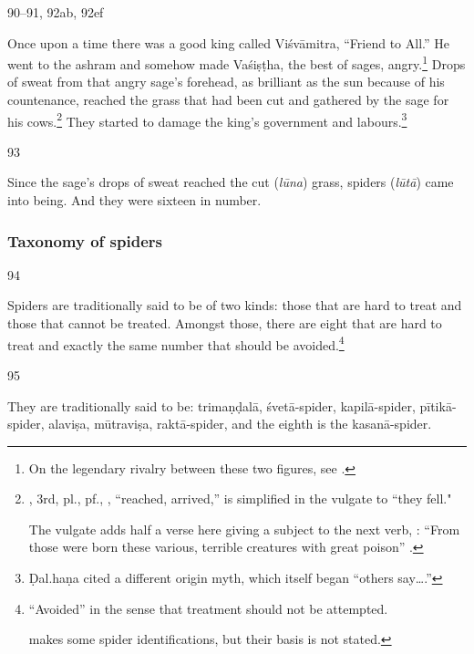 \begin{translation}
 \bigskip
    
\item[90--91, 92ab, 92ef]        

Once upon a time there was a good king called Viśvāmitra, “Friend to
All.”  He went to the ashram and somehow made Vaśiṣṭha, the best of
sages, angry.\footnote{On the legendary rivalry between these two
    figures, see \cite[Introduction, et passim]{sath-2015}.} Drops of
    sweat from that angry sage's forehead, as brilliant as the sun because
    of his countenance, reached the grass that had been cut
   and gathered by the sage for his
    cows.\footnote{, 3rd, pl., pf., \root {},
        “reached, arrived,” is simplified in the vulgate to  “they
        fell."
    
    The vulgate adds half a verse here giving a subject to the next
verb, : “From those were born these various,
terrible creatures with great poison” .} They
started to damage the king's government and labours.\footnote{Ḍal.haṇa 
    cited a different origin myth, which itself began “others say\ldots .”}
    
    
\item[93]

Since the sage's drops of sweat reached the cut
(\emph{lūna}) grass, spiders (\emph{lūtā}) came into being.  And they
were sixteen in number.
    
 
 
 
 \subsubsection{Taxonomy of spiders}
 
 \item[94] 
 
 Spiders are traditionally said to be of two kinds:  those that are hard
 to treat and those that cannot be treated.  Amongst those, there are eight
 that are hard to treat and exactly the same number that should be 
 avoided.\footnote{ “Avoided” in the sense that treatment should not be 
 attempted.
     
     \citet{mana-2009} makes some spider identifications, but 
 their basis is not stated.}
 
 \item[95]
 
 They are traditionally said to be:
 \Gls{trimaṇḍalā}, 
 \Gls{śvetā-spider}, 
 \Gls{kapilā-spider}, 
 \Gls{pītikā-spider}, 
 \Gls{alaviṣa}, 
 \Gls{mūtraviṣa}, 
 \Gls{raktā-spider}, and the eighth is the
 \Gls{kasanā-spider}.
 

\end{translation}

